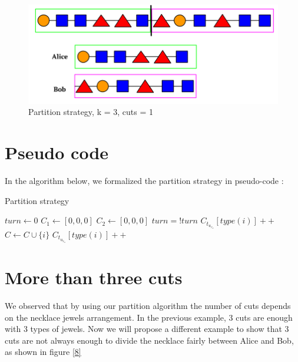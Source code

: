 \documentclass[a4paper,10pt]{article}
\begin{document}
\begin{figure}[H]
  \centering
\includegraphics[scale=.35]{k= 3, cuts = 1.png}
\caption{Partition strategy, k = 3, cuts = 1}
\label{7}
\end{figure}


\section{Pseudo code}
In the algorithm below, we formalized the partition strategy in pseudo-code :

\begin{algorithm}[H]
\caption{Partition strategy}
\begin{algorithmic} [1]
\State $turn\gets0$
\State $C_1\gets[0,0,0]$
\State $C_2\gets[0,0,0]$
 
 
    \State $turn = !turn$ 
    \State $C_t_u_r_n[type(i)]++$
    \State $C\gets C \cup {\{i\}}$ 
 \Else 
 \State $C_t_u_r_n[type(i)]++$ 
 \EndIf
\end{algorithmic}
\end{algorithm}

\section{More than three cuts}
We observed that by using our partition algorithm the number of cuts depends on the necklace jewels arrangement. In the previous example, 3 cuts are enough with 3 types of jewels. Now we will propose a different example to show that 3 cuts are not always enough to divide the necklace fairly between Alice and Bob, as shown in figure \ref{8}
\end{document}
